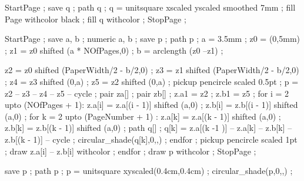 StartPage ;
save q ; path q ;
q = unitsquare xscaled \overlaywidth yscaled \overlayheight smoothed 7mm ;
fill Page withcolor black ;
fill q withcolor  ;
StopPage ;
\stopuniqueMPgraphic 

StartPage ;
save a, b ; numeric a, b ;
save p ; path p ;
a = 3.5mm ;
z0 = (0,5mm) ;
z1 = z0 shifted (a * NOfPages,0) ;
b = arclength (z0 --z1) ;

z2 = z0 shifted (PaperWidth/2 - b/2,0) ;
z3 = z1 shifted (PaperWidth/2 - b/2,0) ;
z4 = z3 shifted (0,a) ;
z5 = z2 shifted (0,a) ;
pickup pencircle scaled 0.5pt ;
p = z2 -- z3 -- z4 -- z5 -- cycle ;
pair za[] ;
pair zb[] ;
z.a1 = z2 ;
z.b1 = z5 ;
for i = 2 upto (NOfPages + 1):
  z.a[i] = z.a[(i - 1)] shifted (a,0) ;
  z.b[i] = z.b[(i - 1)] shifted (a,0) ;
  for k = 2 upto (PageNumber + 1) :
    z.a[k] = z.a[(k - 1)] shifted (a,0) ;
    z.b[k] = z.b[(k - 1)] shifted (a,0) ;
    path q[] ;
    q[k] = z.a[(k -1 )] -- z.a[k] -- z.b[k] -- z.b[(k - 1)] -- cycle ;
    circular_shade(q[k],0,,) ;
  endfor ;
  pickup pencircle scaled 1pt ;
  draw z.a[i] -- z.b[i] withcolor  ;
endfor ;
draw p withcolor  ;
StopPage ;
\stopuseMPgraphic

save p ; path p ;
p = unitsquare xyscaled(0.4cm,0.4cm) ;
circular_shade(p,0,,) ;
\stopuniqueMPgraphic
 







